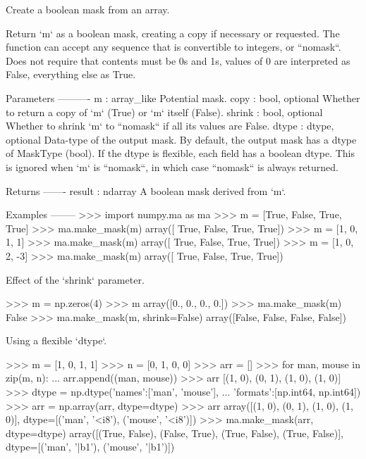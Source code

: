 \begin{DoxyVerb}Create a boolean mask from an array.

Return `m` as a boolean mask, creating a copy if necessary or requested.
The function can accept any sequence that is convertible to integers,
or ``nomask``.  Does not require that contents must be 0s and 1s, values
of 0 are interpreted as False, everything else as True.

Parameters
----------
m : array_like
    Potential mask.
copy : bool, optional
    Whether to return a copy of `m` (True) or `m` itself (False).
shrink : bool, optional
    Whether to shrink `m` to ``nomask`` if all its values are False.
dtype : dtype, optional
    Data-type of the output mask. By default, the output mask has a
    dtype of MaskType (bool). If the dtype is flexible, each field has
    a boolean dtype. This is ignored when `m` is ``nomask``, in which
    case ``nomask`` is always returned.

Returns
-------
result : ndarray
    A boolean mask derived from `m`.

Examples
--------
>>> import numpy.ma as ma
>>> m = [True, False, True, True]
>>> ma.make_mask(m)
array([ True, False,  True,  True])
>>> m = [1, 0, 1, 1]
>>> ma.make_mask(m)
array([ True, False,  True,  True])
>>> m = [1, 0, 2, -3]
>>> ma.make_mask(m)
array([ True, False,  True,  True])

Effect of the `shrink` parameter.

>>> m = np.zeros(4)
>>> m
array([0., 0., 0., 0.])
>>> ma.make_mask(m)
False
>>> ma.make_mask(m, shrink=False)
array([False, False, False, False])

Using a flexible `dtype`.

>>> m = [1, 0, 1, 1]
>>> n = [0, 1, 0, 0]
>>> arr = []
>>> for man, mouse in zip(m, n):
...     arr.append((man, mouse))
>>> arr
[(1, 0), (0, 1), (1, 0), (1, 0)]
>>> dtype = np.dtype({'names':['man', 'mouse'],
...                   'formats':[np.int64, np.int64]})
>>> arr = np.array(arr, dtype=dtype)
>>> arr
array([(1, 0), (0, 1), (1, 0), (1, 0)],
      dtype=[('man', '<i8'), ('mouse', '<i8')])
>>> ma.make_mask(arr, dtype=dtype)
array([(True, False), (False, True), (True, False), (True, False)],
      dtype=[('man', '|b1'), ('mouse', '|b1')])\end{DoxyVerb}
 \mbox{\label{namespacenumpy_1_1ma_1_1core_a0e72c50a10bbb5bfb8ce855602a34c25}} 
